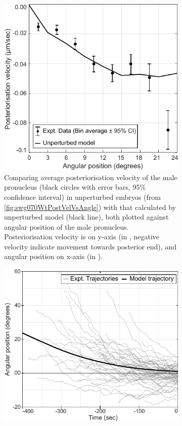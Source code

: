 \begin{figure}
    \centering
    \begin{subfigure}[t]{0.45\textwidth}
        \includegraphics[width=\textwidth]{Results/FigComparePCF/wtPostVelModel.pdf}
        \caption{Comparing average posteriorisation velocity of the male pronucleus (black circles with error bars, \num{95}\% confidence interval) in unperturbed embryos (from \autoref{fig:swg070WtPostVelVsAngle}) with that calculated by unperturbed model (black line), both plotted against angular position of the male pronucleus. Posteriorisation velocity is on y-axis (in \si{\unitPostVel}, negative velocity indicate movement towards posterior end), and angular position on x-axis (in \si{\unitAngle}).}
        \label{subfig:unperturbedModelCompareExpt-postVel}
    \end{subfigure}
    \hfill
    \begin{subfigure}[t]{0.45\textwidth}
        \includegraphics[width=\textwidth]{Results/FigComparePCF/wtTrajectoriesModel.pdf}

\end{subfigure}
\end{figure}
